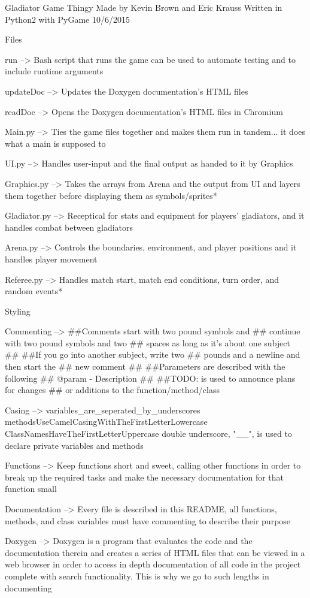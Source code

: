 Gladiator Game Thingy Made by Kevin Brown and Eric Krauss Written in Python2 with Py\+Game 10/6/2015

Files \begin{DoxyVerb}run -->
    Bash script that runs the game
    can be used to automate testing
    and to include runtime arguments

updateDoc -->
    Updates the Doxygen documentation's
    HTML files

readDoc -->
    Opens the Doxygen documentation's
    HTML files in Chromium

Main.py -->
    Ties the game files together and
    makes them run in tandem...
    it does what a main is supposed to

UI.py -->
    Handles user-input and the final
    output as handed to it by Graphics

Graphics.py -->
    Takes the arrays from Arena and the
    output from UI and layers them
    together before displaying them as
    symbols/sprites*

Gladiator.py -->
    Receptical for stats and equipment
    for players' gladiators, and it
    handles combat between gladiators

Arena.py -->
    Controls the boundaries, environment,
    and player positions and it handles
    player movement

Referee.py -->
    Handles match start, match end
    conditions, turn order, and
    random events*
\end{DoxyVerb}


Styling \begin{DoxyVerb}Commenting -->  
    ##Comments start with two pound symbols and
    ##  continue with two pound symbols and two
    ##  spaces as long as it's about one subject
    ##
    ##If you go into another subject, write two 
    ##  pounds and a newline and then start the
    ##  new comment
    ##
    ##Parameters are described with the following
    ##  @param - Description
    ##
    ##TODO:  is used to announce plans for changes
    ##  or additions to the function/method/class

Casing -->
    variables_are_seperated_by_underscores
    methodsUseCamelCasingWithTheFirstLetterLowercase
    ClassNamesHaveTheFirstLetterUppercase
    double underscore, "__", is used to
    declare private variables and methods



Functions -->
    Keep functions short and sweet, calling other
    functions in order to break up the required
    tasks and make the necessary documentation for
    that function small

Documentation -->
    Every file is described in this README, all
    functions, methods, and class variables must
    have commenting to describe their purpose

Doxygen -->
    Doxygen is a program that evaluates the code
    and the documentation therein and creates a
    series of HTML files that can be viewed in a
    web browser in order to access in depth
    documentation of all code in the project
    complete with search functionality.  This
    is why we go to such lengths in documenting\end{DoxyVerb}
 